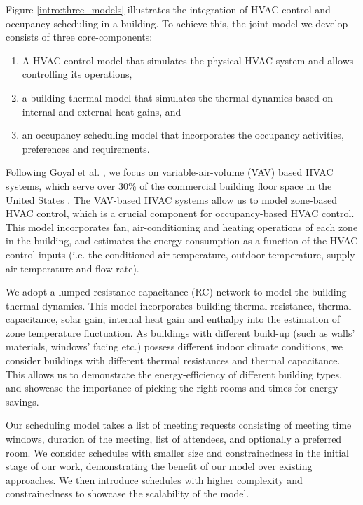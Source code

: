 Figure \ref{intro:three_models} illustrates the integration of HVAC control and occupancy scheduling in a building. To achieve this, the joint model we develop consists of three core-components: 
\begin{enumerate}
		\item A HVAC control model that simulates the physical HVAC system and allows controlling its operations, %
		\item a building thermal model that simulates the thermal dynamics based on internal and external heat gains, and
		\item an occupancy scheduling model that incorporates the occupancy activities, preferences and requirements.
	\end{enumerate}

Following Goyal et al. \citep{goyal2012method,goyal2013occupancy}, we focus on variable-air-volume (VAV) based HVAC systems, which serve over 30\% of the commercial building floor space in the United States \citep{eia2012cbecs}. The VAV-based HVAC systems allow us to model zone-based HVAC control, which is a crucial component for occupancy-based HVAC control. This model incorporates fan, air-conditioning and heating operations of each zone in the building, and estimates the energy consumption as a function of the HVAC control inputs (i.e. the conditioned air temperature, outdoor temperature, supply air temperature and flow rate). 

We adopt a lumped resistance-capacitance (RC)-network to model the building thermal dynamics. This model incorporates building thermal resistance, thermal capacitance, solar gain, internal heat gain and enthalpy into the estimation of zone temperature fluctuation. As buildings with different build-up (such as walls' materials, windows' facing etc.) possess different indoor climate conditions, we consider buildings with different thermal resistances and thermal capacitance. This allows us to demonstrate the energy-efficiency of different building types, and showcase the importance of picking the right rooms and times for energy savings.

Our scheduling model takes a list of meeting requests consisting of meeting time windows, duration of the meeting, list of attendees, and optionally a preferred room. We consider schedules with smaller size and constrainedness in the initial stage of our work, demonstrating the benefit of our model over existing approaches. We then introduce schedules with higher complexity and constrainedness to showcase the scalability of the model.

